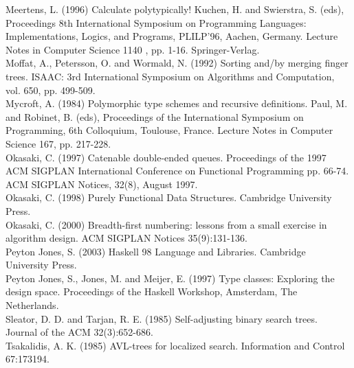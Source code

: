 \documentclass[10pt]{article}
\begin{document}
Meertens, L. (1996) Calculate polytypically! Kuchen, H. and Swierstra, S. (eds), Proceedings 8th International Symposium on Programming Languages: Implementations, Logics, and Programs, PLILP'96, Aachen, Germany. Lecture Notes in Computer Science 1140 , pp. 1-16. Springer-Verlag.\\
Moffat, A., Petersson, O. and Wormald, N. (1992) Sorting and/by merging finger trees. ISAAC: 3rd International Symposium on Algorithms and Computation, vol. 650, pp. 499-509.\\
Mycroft, A. (1984) Polymorphic type schemes and recursive definitions. Paul, M. and Robinet, B. (eds), Proceedings of the International Symposium on Programming, 6th Colloquium, Toulouse, France. Lecture Notes in Computer Science 167, pp. 217-228.\\
Okasaki, C. (1997) Catenable double-ended queues. Proceedings of the 1997 ACM SIGPLAN International Conference on Functional Programming pp. 66-74. ACM SIGPLAN Notices, 32(8), August 1997.\\
Okasaki, C. (1998) Purely Functional Data Structures. Cambridge University Press.\\
Okasaki, C. (2000) Breadth-first numbering: lessons from a small exercise in algorithm design. ACM SIGPLAN Notices 35(9):131-136.\\
Peyton Jones, S. (2003) Haskell 98 Language and Libraries. Cambridge University Press.\\
Peyton Jones, S., Jones, M. and Meijer, E. (1997) Type classes: Exploring the design space. Proceedings of the Haskell Workshop, Amsterdam, The Netherlands.\\
Sleator, D. D. and Tarjan, R. E. (1985) Self-adjusting binary search trees. Journal of the ACM 32(3):652-686.\\
Tsakalidis, A. K. (1985) AVL-trees for localized search. Information and Control 67:173194.
\end{document}
